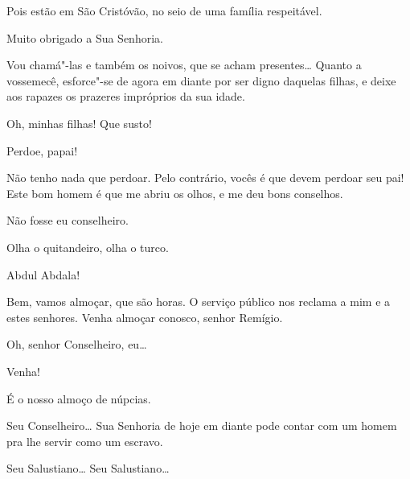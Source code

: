  Pois estão em São Cristóvão, no seio de uma família respeitável.

 Muito obrigado a Sua Senhoria.

 Vou chamá"-las e também os noivos, que se acham presentes\ldots
{} Quanto a vossemecê,
esforce"-se de agora em diante por ser digno daquelas filhas, e deixe aos rapazes
os prazeres impróprios da sua idade.  




 Oh, minhas filhas! Que susto!

 Perdoe, papai!

 Não tenho nada que perdoar.  Pelo contrário, vocês é que
devem perdoar seu pai! Este bom homem é que me abriu os olhos, e me deu bons
conselhos.

 Não fosse eu conselheiro.

   Olha o quitandeiro, olha o
turco.

 Abdul Abdala!

 Bem, vamos almoçar, que são horas. O serviço público nos
reclama a mim e a estes senhores. Venha almoçar conosco, senhor Remígio.

 Oh, senhor Conselheiro, eu\ldots

 Venha!

 É o nosso almoço de núpcias. 

 Seu Conselheiro\ldots{} Sua Senhoria de hoje em diante pode contar
com um homem pra lhe servir como um escravo. 







 Seu Salustiano\ldots{} Seu Salustiano\ldots{} 

